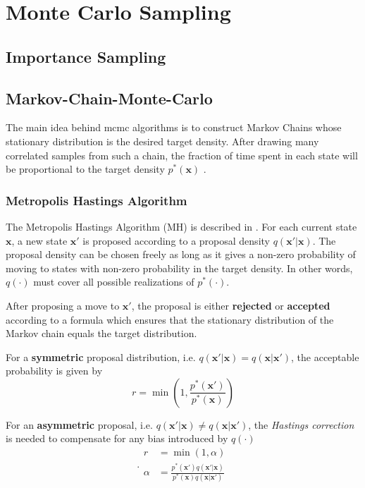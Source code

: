 
\chapter{Monte Carlo Sampling}
\section{Importance Sampling}\label{sec:theory_importance_sampling}

\section{Markov-Chain-Monte-Carlo}
The main idea behind \acrfull{mcmc} algorithms is to construct Markov Chains whose stationary distribution is the desired target density. After drawing many correlated samples from such a chain, the fraction of time spent in each state will be proportional to the target density $p^*(\mathbf{x})$ \cite{murphy}. 

\subsection{Metropolis Hastings Algorithm}
The Metropolis Hastings Algorithm (MH) is described in \cite[p.~850]{murphy}.
For each current state $\mathbf{x}$, a new state $\mathbf{x'}$ is proposed according to a proposal density $q(\mathbf{x'} | \mathbf{x})$. The proposal density can be chosen freely as long as it gives a non-zero probability of moving to states with non-zero probability in the target density. In other words, $q(\cdot)$ must cover all possible realizations of $p^*(\cdot)$. 

After proposing a move to $\mathbf{x'}$, the proposal is either \textbf{rejected} or \textbf{accepted} according to a formula which ensures that the stationary distribution of the Markov chain equals the target distribution. 

For a \textbf{symmetric} proposal distribution, i.e. $q(\mathbf{x'} | \mathbf{x}) = q(\mathbf{x}| \mathbf{x'})$, the acceptable probability is given by 
\begin{equation}
    r = \min(1, \frac{p^*(\mathbf{x'})}{p^*(\mathbf{x})})
\end{equation}

For an \textbf{asymmetric} proposal, i.e. $q(\mathbf{x'} | \mathbf{x}) \neq q(\mathbf{x} | \mathbf{x'})$, the \textit{Hastings correction} is needed to compensate for any bias introduced by $q(\cdot)$
\begin{subequations}.
\begin{align}
    r &= \min(1, \alpha)\\
    \alpha &= \frac{p^*(\mathbf{x'}) q(\mathbf{x'} | \mathbf{x})}{p^*(\mathbf{x}) q(\mathbf{x}| \mathbf{x'})}\label{eq:mcmc_mh_acceptance}
\end{align}
\end{subequations}

